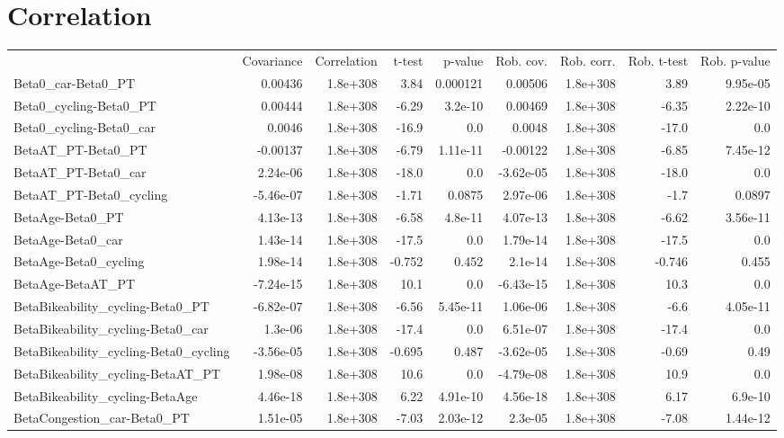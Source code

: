 \section{Correlation}
\begin{tabular}{lrrrrrrrr}
 & Covariance & Correlation & t-test & p-value & Rob. cov. & Rob. corr. & Rob. t-test & Rob. p-value \\
Beta0_car-Beta0_PT & 0.00436 & 1.8e+308 & 3.84 & 0.000121 & 0.00506 & 1.8e+308 & 3.89 & 9.95e-05 \\
Beta0_cycling-Beta0_PT & 0.00444 & 1.8e+308 & -6.29 & 3.2e-10 & 0.00469 & 1.8e+308 & -6.35 & 2.22e-10 \\
Beta0_cycling-Beta0_car & 0.0046 & 1.8e+308 & -16.9 & 0.0 & 0.0048 & 1.8e+308 & -17.0 & 0.0 \\
BetaAT_PT-Beta0_PT & -0.00137 & 1.8e+308 & -6.79 & 1.11e-11 & -0.00122 & 1.8e+308 & -6.85 & 7.45e-12 \\
BetaAT_PT-Beta0_car & 2.24e-06 & 1.8e+308 & -18.0 & 0.0 & -3.62e-05 & 1.8e+308 & -18.0 & 0.0 \\
BetaAT_PT-Beta0_cycling & -5.46e-07 & 1.8e+308 & -1.71 & 0.0875 & 2.97e-06 & 1.8e+308 & -1.7 & 0.0897 \\
BetaAge-Beta0_PT & 4.13e-13 & 1.8e+308 & -6.58 & 4.8e-11 & 4.07e-13 & 1.8e+308 & -6.62 & 3.56e-11 \\
BetaAge-Beta0_car & 1.43e-14 & 1.8e+308 & -17.5 & 0.0 & 1.79e-14 & 1.8e+308 & -17.5 & 0.0 \\
BetaAge-Beta0_cycling & 1.98e-14 & 1.8e+308 & -0.752 & 0.452 & 2.1e-14 & 1.8e+308 & -0.746 & 0.455 \\
BetaAge-BetaAT_PT & -7.24e-15 & 1.8e+308 & 10.1 & 0.0 & -6.43e-15 & 1.8e+308 & 10.3 & 0.0 \\
BetaBikeability_cycling-Beta0_PT & -6.82e-07 & 1.8e+308 & -6.56 & 5.45e-11 & 1.06e-06 & 1.8e+308 & -6.6 & 4.05e-11 \\
BetaBikeability_cycling-Beta0_car & 1.3e-06 & 1.8e+308 & -17.4 & 0.0 & 6.51e-07 & 1.8e+308 & -17.4 & 0.0 \\
BetaBikeability_cycling-Beta0_cycling & -3.56e-05 & 1.8e+308 & -0.695 & 0.487 & -3.62e-05 & 1.8e+308 & -0.69 & 0.49 \\
BetaBikeability_cycling-BetaAT_PT & 1.98e-08 & 1.8e+308 & 10.6 & 0.0 & -4.79e-08 & 1.8e+308 & 10.9 & 0.0 \\
BetaBikeability_cycling-BetaAge & 4.46e-18 & 1.8e+308 & 6.22 & 4.91e-10 & 4.56e-18 & 1.8e+308 & 6.17 & 6.9e-10 \\
BetaCongestion_car-Beta0_PT & 1.51e-05 & 1.8e+308 & -7.03 & 2.03e-12 & 2.3e-05 & 1.8e+308 & -7.08 & 1.44e-12 \\

\end{tabular}
